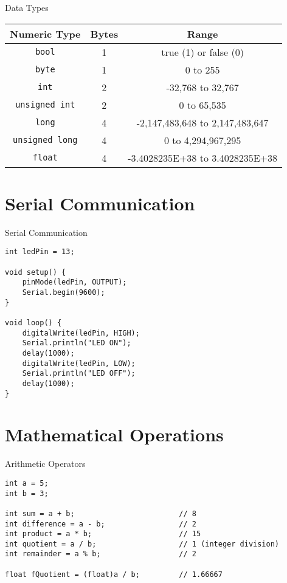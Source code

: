 \documentclass[sectionframe]{oxblue-beamer}
\begin{document}
\begin{frame}{Data Types}
\begin{table}
\footnotesize
\centering
\begin{tabular}{|c|c|c|}
\hline
\textbf{Numeric Type} & \textbf{Bytes} & \textbf{Range} \\ \hline
\texttt{bool} & 1 & true (1) or false (0) \\ \hline
\texttt{byte} & 1 & 0 to 255 \\ \hline
\texttt{int} & 2 & -32,768 to 32,767 \\ \hline
\texttt{unsigned int} & 2 & 0 to 65,535 \\ \hline
\texttt{long} & 4 & -2,147,483,648 to 2,147,483,647 \\ \hline
\texttt{unsigned long} & 4 & 0 to 4,294,967,295 \\ \hline
\texttt{float} & 4 & -3.4028235E+38 to 3.4028235E+38 \\ \hline
\end{tabular}
\end{table}
\end{frame}

\section{Serial Communication}

\begin{frame}[fragile]{Serial Communication}
\begin{verbatim}
int ledPin = 13;

void setup() {
    pinMode(ledPin, OUTPUT);
    Serial.begin(9600);
}

void loop() {
    digitalWrite(ledPin, HIGH);
    Serial.println("LED ON");
    delay(1000);
    digitalWrite(ledPin, LOW);
    Serial.println("LED OFF");
    delay(1000);
}
\end{verbatim}
\end{frame}

\section{Mathematical Operations}

\begin{frame}[fragile]{Arithmetic Operators}
\begin{verbatim}
int a = 5;
int b = 3;

int sum = a + b;                        // 8
int difference = a - b;                 // 2
int product = a * b;                    // 15
int quotient = a / b;                   // 1 (integer division)
int remainder = a % b;                  // 2

float fQuotient = (float)a / b;         // 1.66667
\end{verbatim}
\end{frame}
\end{document}
